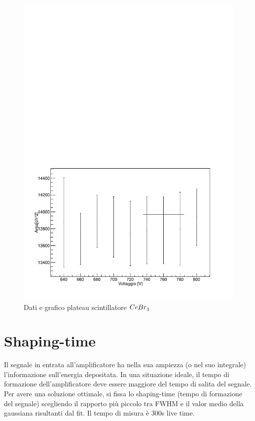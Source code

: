 \documentclass[italian,11pt]{report}
\begin{document}
\begin{itemize}
\begin{figure}[htp]
\centering
\includegraphics[width=13cm]{plateauCeBr3.pdf}
\caption{Dati e grafico plateau scintillatore $\prescript{}{}{CeBr}_{3}^{}$}
\end{figure}

 
   
   
    
\end{itemize}  

\newpage
\section{Shaping-time}
Il segnale in entrata all'amplificatore ha nella sua ampiezza (o nel suo integrale) l'informazione sull'energia depositata. In una situazione ideale, il tempo di formazione dell'amplificatore deve essere maggiore del tempo di salita del segnale. Per avere una soluzione ottimale, si fissa lo shaping-time (tempo di formazione del segnale) scegliendo il rapporto più piccolo tra FWHM e il valor medio della gaussiana risultanti dal fit. Il tempo di misura è 300s live time.
\end{document}
